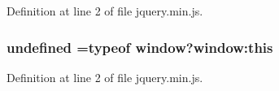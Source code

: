 Definition at line 2 of file jquery.\+min.\+js.

\hypertarget{a00030_ae21cc36bf0d65014c717a481a3f8a468}{}
\subsubsection[{undefined}]{\setlength{\rightskip}{0pt plus 5cm}undefined =typeof window?window\+:this}\label{a00030_ae21cc36bf0d65014c717a481a3f8a468}


Definition at line 2 of file jquery.\+min.\+js.

